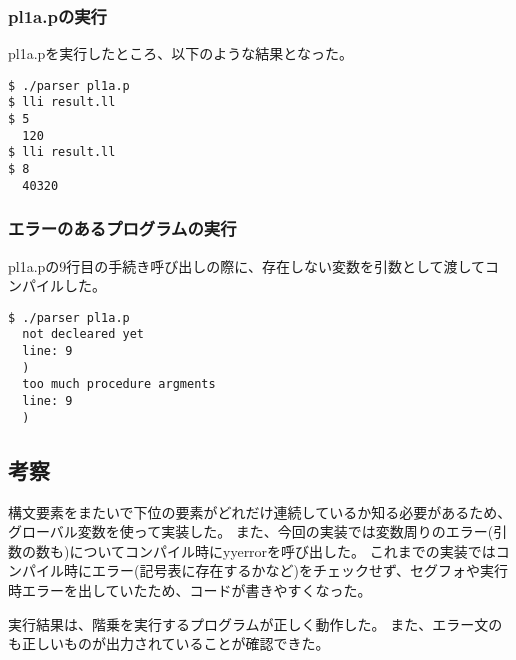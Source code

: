\subsubsection{pl1a.pの実行}
pl1a.pを実行したところ、以下のような結果となった。
\begin{lstlisting}[caption={pl1a.pの実行コマンド、結果},label={pl1a.pの実行コマンド、結果}]
$ ./parser pl1a.p
$ lli result.ll
$ 5
  120
$ lli result.ll
$ 8
  40320
\end{lstlisting}

\subsubsection{エラーのあるプログラムの実行}
pl1a.pの9行目の手続き呼び出しの際に、存在しない変数を引数として渡してコンパイルした。
\begin{lstlisting}[caption={ミスのあるpl1a.pの実行結果},label={ミスのあるpl1a.pの実行結果}]
$ ./parser pl1a.p
  not decleared yet
  line: 9
  )
  too much procedure argments
  line: 9
  )
\end{lstlisting}

\subsection{考察}
構文要素をまたいで下位の要素がどれだけ連続しているか知る必要があるため、グローバル変数を使って実装した。
また、今回の実装では変数周りのエラー(引数の数も)についてコンパイル時にyyerrorを呼び出した。
これまでの実装ではコンパイル時にエラー(記号表に存在するかなど)をチェックせず、セグフォや実行時エラーを出していたため、コードが書きやすくなった。

実行結果は、階乗を実行するプログラムが正しく動作した。
また、エラー文のも正しいものが出力されていることが確認できた。
